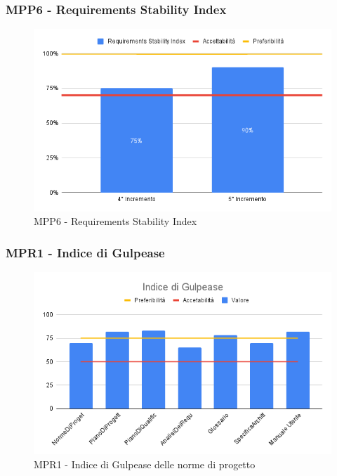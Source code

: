 \subsubsection{MPP6 - Requirements Stability Index}

\begin{figure}[H]
	\centering
	\includegraphics[scale = 0.6]{sezioni/Images/PB/RequirementsStabilityIndex.png}
	\caption{MPP6 - Requirements Stability Index}
\end{figure}

\subsubsection{MPR1 - Indice di Gulpease}

\begin{figure}[H]
	\centering
	\includegraphics[scale = 0.6]{sezioni/Images/PB/GulpeaseGenerale.png}
	\caption{MPR1 - Indice di Gulpease delle norme di progetto}
\end{figure}

